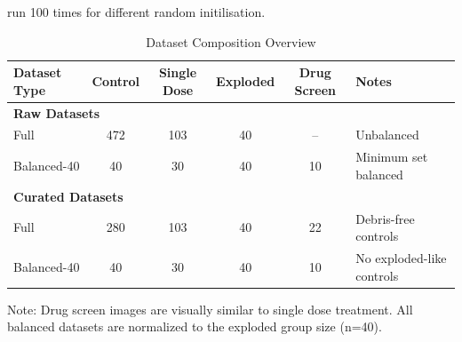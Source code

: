     

run 100 times for different random initilisation.

\begin{table}[htbp]
    \centering
    \caption{Dataset Composition Overview}
    \begin{tabular}{lccccl}
    \toprule
    Dataset Type & Control & Single Dose & Exploded & Drug Screen & Notes \\
    \midrule
    \multicolumn{6}{l}{\textbf{Raw Datasets}} \\
    \midrule
    Full & 472 & 103 & 40 & -- & Unbalanced \\
    Balanced-40 & 40 & 30 & 40 & 10 & Minimum set balanced \\
    \midrule
    \multicolumn{6}{l}{\textbf{Curated Datasets}} \\
    \midrule
    Full & 280 & 103 & 40 & 22 & Debris-free controls \\
    Balanced-40 & 40 & 30 & 40 & 10 & No exploded-like controls \\
    \bottomrule
    \end{tabular}
    \begin{flushleft}
    \small
    Note: Drug screen images are visually similar to single dose treatment. All balanced datasets are normalized to the exploded group size (n=40).
    \end{flushleft}
    \end{table}

